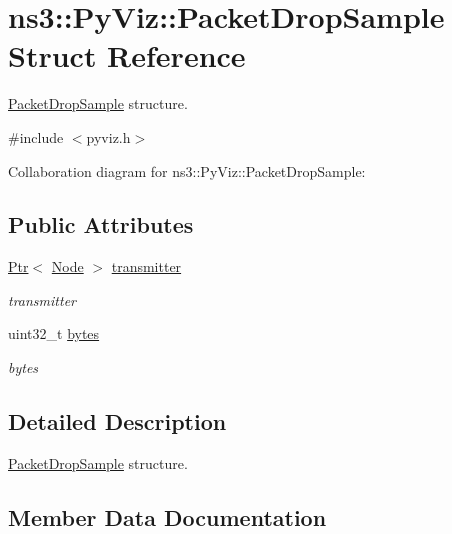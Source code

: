 \hypertarget{structns3_1_1PyViz_1_1PacketDropSample}{}\section{ns3\+:\+:Py\+Viz\+:\+:Packet\+Drop\+Sample Struct Reference}
\label{structns3_1_1PyViz_1_1PacketDropSample}


\hyperlink{structns3_1_1PyViz_1_1PacketDropSample}{Packet\+Drop\+Sample} structure.  




{\ttfamily \#include $<$pyviz.\+h$>$}



Collaboration diagram for ns3\+:\+:Py\+Viz\+:\+:Packet\+Drop\+Sample\+:
\subsection*{Public Attributes}
\begin{DoxyCompactItemize}
\item 
\hyperlink{classns3_1_1Ptr}{Ptr}$<$ \hyperlink{classns3_1_1Node}{Node} $>$ \hyperlink{structns3_1_1PyViz_1_1PacketDropSample_a48da4df9e1f62cf7dc692ce1cbab9f63}{transmitter}
\begin{DoxyCompactList}\small\item\em transmitter \end{DoxyCompactList}\item 
uint32\+\_\+t \hyperlink{structns3_1_1PyViz_1_1PacketDropSample_aef17684b0f3f9e58f7b1f45f49b7e4da}{bytes}
\begin{DoxyCompactList}\small\item\em bytes \end{DoxyCompactList}\end{DoxyCompactItemize}


\subsection{Detailed Description}
\hyperlink{structns3_1_1PyViz_1_1PacketDropSample}{Packet\+Drop\+Sample} structure. 

\subsection{Member Data Documentation}
